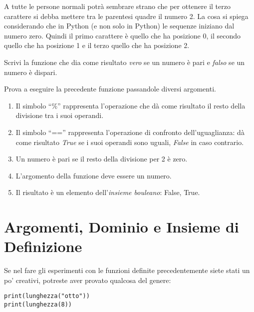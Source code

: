\begin{osservazione}
 A tutte le persone normali potrà sembrare strano che per ottenere il 
terzo carattere si debba mettere tra le parentesi quadre il numero 2. 
La cosa si spiega considerando che in Python (e non solo in Python) le 
sequenze iniziano dal numero zero. Quindi il primo carattere è quello che 
ha posizione 0, il secondo quello che ha posizione 1 e il terzo quello che 
ha posizione 2.
\end{osservazione}

\begin{esempio}
Scrivi la funzione che dia come risultato \emph{vero} se un numero è pari e 
\emph{falso} se un numero è dispari.


Prova a eseguire la precedente funzione passandole diversi argomenti.
\end{esempio}

\begin{osservazione}
 \begin{enumerate} [nosep]
  \item Il simbolo ``\%'' rappresenta l'operazione che dà come risultato il 
resto della divisione tra i suoi operandi.
  \item Il simbolo ``=='' rappresenta l'operazione di confronto 
dell'uguaglianza: 
dà come risultato \emph{True} se i suoi operandi sono uguali, \emph{False} 
in caso contrario.
  \item Un numero è pari se il resto della divisione per 2 è zero.
  \item L'argomento della funzione deve essere un numero.
  \item Il risultato è un elemento dell'\emph{insieme bouleano}: {False, 
True}.
 \end{enumerate}
\end{osservazione}

\section{Argomenti, Dominio e Insieme di Definizione}
\label{sec:funzioni2_dominio}

Se nel fare gli esperimenti con le funzioni definite precedentemente siete 
stati un po' creativi, potreste aver provato qualcosa del genere:

\begin{lstlisting}
print(lunghezza("otto"))
print(lunghezza(8))
\end{lstlisting}

